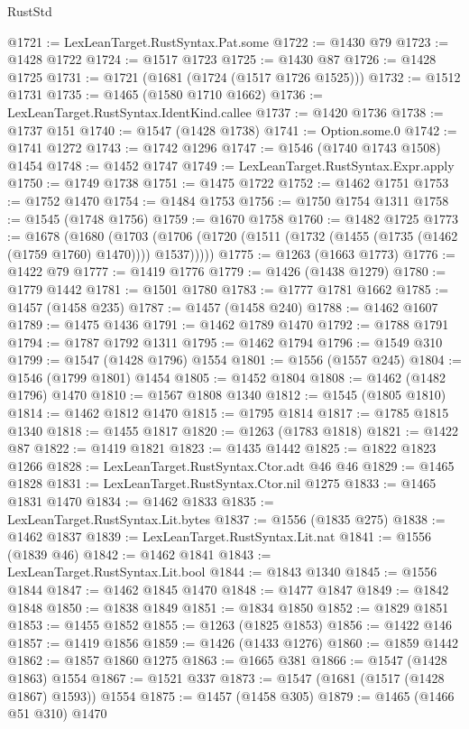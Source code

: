 \begin{lexlean}{RustStd}
\begin{coremodule}
@1721 := LexLeanTarget.RustSyntax.Pat.some
@1722 := @1430 @79
@1723 := @1428 @1722
@1724 := @1517 @1723
@1725 := @1430 @87
@1726 := @1428 @1725
@1731 := @1721 (@1681 (@1724 (@1517 @1726 @1525)))
@1732 := @1512 @1731
@1735 := @1465 (@1580 @1710 @1662)
@1736 := LexLeanTarget.RustSyntax.IdentKind.callee
@1737 := @1420 @1736
@1738 := @1737 @151
@1740 := @1547 (@1428 @1738)
@1741 := Option.some.{0}
@1742 := @1741 @1272
@1743 := @1742 @1296
@1747 := @1546 (@1740 @1743 @1508) @1454
@1748 := @1452 @1747
@1749 := LexLeanTarget.RustSyntax.Expr.apply
@1750 := @1749 @1738
@1751 := @1475 @1722
@1752 := @1462 @1751
@1753 := @1752 @1470
@1754 := @1484 @1753
@1756 := @1750 @1754 @1311
@1758 := @1545 (@1748 @1756)
@1759 := @1670 @1758
@1760 := @1482 @1725
@1773 := @1678
    (@1680
      (@1703 (@1706 (@1720 (@1511 (@1732 (@1455 (@1735 (@1462 (@1759 @1760) @1470)))) @1537)))))
@1775 := @1263 (@1663 @1773)
@1776 := @1422 @79
@1777 := @1419 @1776
@1779 := @1426 (@1438 @1279)
@1780 := @1779 @1442
@1781 := @1501 @1780
@1783 := @1777 @1781 @1662
@1785 := @1457 (@1458 @235)
@1787 := @1457 (@1458 @240)
@1788 := @1462 @1607
@1789 := @1475 @1436
@1791 := @1462 @1789 @1470
@1792 := @1788 @1791
@1794 := @1787 @1792 @1311
@1795 := @1462 @1794
@1796 := @1549 @310
@1799 := @1547 (@1428 @1796) @1554
@1801 := @1556 (@1557 @245)
@1804 := @1546 (@1799 @1801) @1454
@1805 := @1452 @1804
@1808 := @1462 (@1482 @1796) @1470
@1810 := @1567 @1808 @1340
@1812 := @1545 (@1805 @1810)
@1814 := @1462 @1812 @1470
@1815 := @1795 @1814
@1817 := @1785 @1815 @1340
@1818 := @1455 @1817
@1820 := @1263 (@1783 @1818)
@1821 := @1422 @87
@1822 := @1419 @1821
@1823 := @1435 @1442
@1825 := @1822 @1823 @1266
@1828 := LexLeanTarget.RustSyntax.Ctor.adt @46 @46
@1829 := @1465 @1828
@1831 := LexLeanTarget.RustSyntax.Ctor.nil @1275
@1833 := @1465 @1831 @1470
@1834 := @1462 @1833
@1835 := LexLeanTarget.RustSyntax.Lit.bytes
@1837 := @1556 (@1835 @275)
@1838 := @1462 @1837
@1839 := LexLeanTarget.RustSyntax.Lit.nat
@1841 := @1556 (@1839 @46)
@1842 := @1462 @1841
@1843 := LexLeanTarget.RustSyntax.Lit.bool
@1844 := @1843 @1340
@1845 := @1556 @1844
@1847 := @1462 @1845 @1470
@1848 := @1477 @1847
@1849 := @1842 @1848
@1850 := @1838 @1849
@1851 := @1834 @1850
@1852 := @1829 @1851
@1853 := @1455 @1852
@1855 := @1263 (@1825 @1853)
@1856 := @1422 @146
@1857 := @1419 @1856
@1859 := @1426 (@1433 @1276)
@1860 := @1859 @1442
@1862 := @1857 @1860 @1275
@1863 := @1665 @381
@1866 := @1547 (@1428 @1863) @1554
@1867 := @1521 @337
@1873 := @1547 (@1681 (@1517 (@1428 @1867) @1593)) @1554
@1875 := @1457 (@1458 @305)
@1879 := @1465 (@1466 @51 @310) @1470

\end{coremodule}
\end{lexlean}
